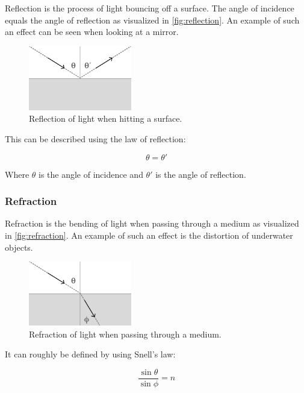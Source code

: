 Reflection is the process of light bouncing off a surface. The angle of incidence equals the angle of reflection as visualized in \autoref{fig:reflection}. An example of such an effect can be seen when looking at a mirror.

\begin{figure}[H]
  \centering
  \includegraphics[width=0.4\textwidth]{resources/reflection.png}
  \caption{Reflection of light when hitting a surface.}
  \label{fig:reflection}
\end{figure}

This can be described using the law of reflection:

\begin{equation}
  \label{eqn:law-of-reflection}
  \theta = \theta'
\end{equation}

Where $\theta$ is the angle of incidence and $\theta'$ is the angle of reflection.

\subsubsection{Refraction}

Refraction is the bending of light when passing through a medium as visualized in \autoref{fig:refraction}. An example of such an effect is the distortion of underwater objects.

\begin{figure}[H]
  \centering
  \includegraphics[width=0.4\textwidth]{resources/refraction.png}
  \caption{Refraction of light when passing through a medium.}
  \label{fig:refraction}
\end{figure}

It can roughly be defined by using Snell's law:

\begin{equation}
  \label{eqn:snells-law}
  \frac{\sin \theta}{\sin \phi} = n
\end{equation}

